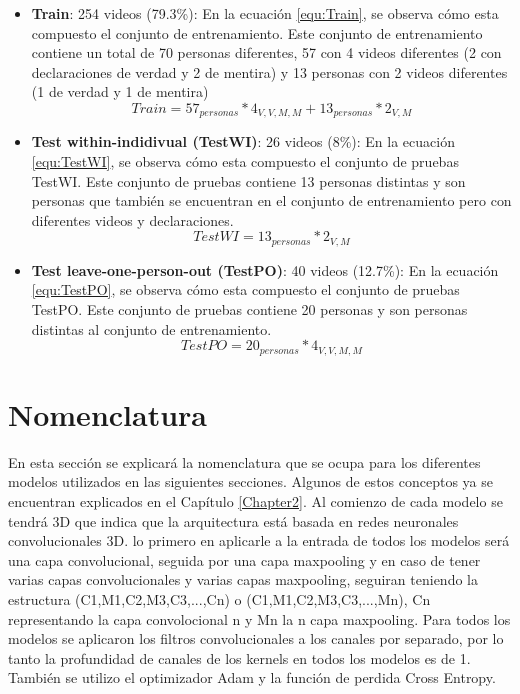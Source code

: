 \begin{onehalfspacing}
\begin{itemize}
    \item \textbf{Train}: 254 videos (79.3\%): En la ecuación \ref{equ:Train}, se observa cómo esta compuesto el conjunto de entrenamiento. Este conjunto de entrenamiento contiene un total de 70 personas diferentes, 57 con 4 videos diferentes (2 con declaraciones de verdad y 2 de mentira) y 13 personas con 2 videos diferentes (1 de verdad y 1 de mentira)
    \begin{equation}
    \label{equ:Train}
        Train = 57_{personas} * 4_{V,V,M,M} + 13_{personas} * 2_{V,M}
    \end{equation}
    
    \item \textbf{Test within-indidivual (TestWI)}: 26 videos (8\%): En la ecuación \ref{equ:TestWI}, se observa cómo esta compuesto el conjunto de pruebas TestWI. Este conjunto de pruebas contiene 13 personas distintas y son personas que también se encuentran en el conjunto de entrenamiento pero con diferentes videos y declaraciones.
    \begin{equation}
    \label{equ:TestWI}
        TestWI = 13_{personas} * 2_{V,M}
    \end{equation}
    
    \item \textbf{Test leave-one-person-out (TestPO)}: 40 videos (12.7\%): En la ecuación \ref{equ:TestPO}, se observa cómo esta compuesto el conjunto de pruebas TestPO. Este conjunto de pruebas contiene 20 personas y son personas distintas al conjunto de entrenamiento.
    \begin{equation}
    \label{equ:TestPO}
        TestPO = 20_{personas} * 4_{V,V,M,M}
    \end{equation}
    
\end{itemize}


\section{Nomenclatura}
\label{sec:Nomenclatura}

En esta sección se explicará la nomenclatura que se ocupa para los diferentes modelos utilizados en las siguientes secciones. Algunos de estos conceptos ya se encuentran explicados en el Capítulo \ref{Chapter2}. Al comienzo de cada modelo se tendrá 3D que indica que la arquitectura está basada en redes neuronales convolucionales 3D. lo primero en aplicarle a la entrada de todos los modelos será una capa convolucional, seguida por una capa maxpooling y en caso de tener varias capas convolucionales y varias capas maxpooling, seguiran teniendo la estructura (C1,M1,C2,M3,C3,...,Cn) o (C1,M1,C2,M3,C3,...,Mn), Cn representando la capa convolocional n y Mn la n capa maxpooling. Para todos los modelos se aplicaron los filtros convolucionales a los canales por separado, por lo tanto la profundidad de canales de los kernels en todos los modelos es de 1. También se utilizo el optimizador Adam y la función de perdida Cross Entropy.


\end{onehalfspacing}
